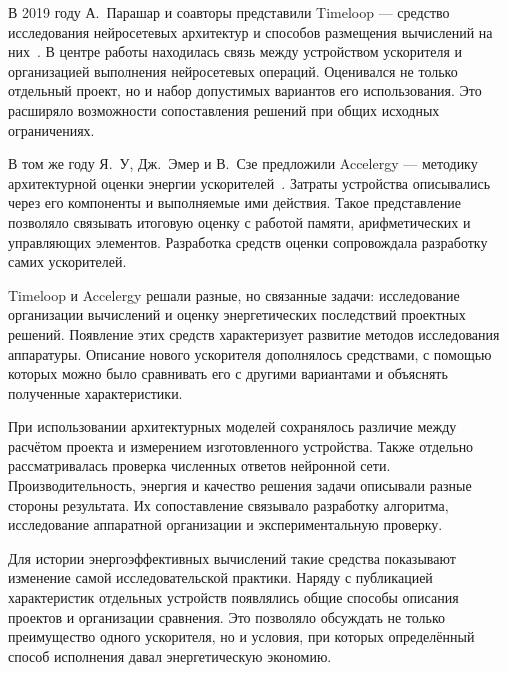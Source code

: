 В 2019 году А.~Парашар и соавторы представили Timeloop —
средство исследования нейросетевых архитектур и способов
размещения вычислений на них~\cite{timeloop2019}.
В центре работы находилась связь между устройством ускорителя
и организацией выполнения нейросетевых операций.
Оценивался не только отдельный проект, но и набор допустимых
вариантов его использования. Это расширяло возможности
сопоставления решений при общих исходных ограничениях.

В том же году Я.~У, Дж.~Эмер и В.~Сзе предложили Accelergy —
методику архитектурной оценки энергии ускорителей~\cite{accelergy2019}.
Затраты устройства описывались через его компоненты
и выполняемые ими действия. Такое представление позволяло
связывать итоговую оценку с работой памяти, арифметических
и управляющих элементов. Разработка средств оценки
сопровождала разработку самих ускорителей.

Timeloop и Accelergy решали разные, но связанные задачи:
исследование организации вычислений и оценку энергетических
последствий проектных решений. Появление этих средств
характеризует развитие методов исследования аппаратуры.
Описание нового ускорителя дополнялось средствами,
с помощью которых можно было сравнивать его с другими
вариантами и объяснять полученные характеристики.

При использовании архитектурных моделей сохранялось различие
между расчётом проекта и измерением изготовленного устройства.
Также отдельно рассматривалась проверка численных ответов
нейронной сети. Производительность, энергия и качество
решения задачи описывали разные стороны результата.
Их сопоставление связывало разработку алгоритма,
исследование аппаратной организации и экспериментальную проверку.

Для истории энергоэффективных вычислений такие средства
показывают изменение самой исследовательской практики.
Наряду с публикацией характеристик отдельных устройств
появлялись общие способы описания проектов и организации
сравнения. Это позволяло обсуждать не только преимущество
одного ускорителя, но и условия, при которых определённый
способ исполнения давал энергетическую экономию.
